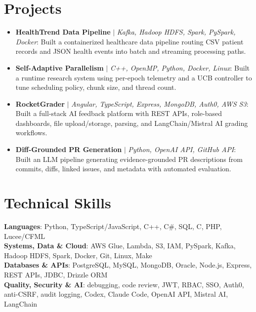 \documentclass[letterpaper,11pt]{article}
\begin{document}
\section{Projects}
\begin{itemize}[leftmargin=0.15in, label={}, itemsep=1pt, topsep=1pt, parsep=0pt]
  \item\small{\textbf{HealthTrend Data Pipeline} $|$ \emph{Kafka, Hadoop HDFS, Spark, PySpark, Docker}: Built a containerized healthcare data pipeline routing CSV patient records and JSON health events into batch and streaming processing paths.}
  \item\small{\textbf{Self-Adaptive Parallelism} $|$ \emph{C++, OpenMP, Python, Docker, Linux}: Built a runtime research system using per-epoch telemetry and a UCB controller to tune scheduling policy, chunk size, and thread count.}
  \item\small{\textbf{RocketGrader} $|$ \emph{Angular, TypeScript, Express, MongoDB, Auth0, AWS S3}: Built a full-stack AI feedback platform with REST APIs, role-based dashboards, file upload/storage, parsing, and LangChain/Mistral AI grading workflows.}
  \item\small{\textbf{Diff-Grounded PR Generation} $|$ \emph{Python, OpenAI API, GitHub API}: Built an LLM pipeline generating evidence-grounded PR descriptions from commits, diffs, linked issues, and metadata with automated evaluation.}
\end{itemize}\vspace{-7pt}

\section{Technical Skills}
 \begin{itemize}[leftmargin=0.15in, label={}]
    \small{\item{
     \textbf{Languages}{: Python, TypeScript/JavaScript, C++, C\#, SQL, C, PHP, Lucee/CFML} \\
     \textbf{Systems, Data \& Cloud}{: AWS Glue, Lambda, S3, IAM, PySpark, Kafka, Hadoop HDFS, Spark, Docker, Git, Linux, Make} \\
     \textbf{Databases \& APIs}{: PostgreSQL, MySQL, MongoDB, Oracle, Node.js, Express, REST APIs, JDBC, Drizzle ORM} \\
     \textbf{Quality, Security \& AI}{: debugging, code review, JWT, RBAC, SSO, Auth0, anti-CSRF, audit logging, Codex, Claude Code, OpenAI API, Mistral AI, LangChain}
    }}
 \end{itemize}
\end{document}
